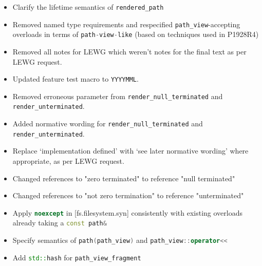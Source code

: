 \documentclass[11pt]{article}
\newcommand{\code}[2][cpp]{\lstinline[language=#1,basicstyle=\small\ttfamily]{#2}}
\begin{document}
\begin{itemize}
\begin{itemize}
    \item Clarify the lifetime semantics of \code{rendered_path}
    \item Removed named type requirements and respecified \code{path_view}-accepting overloads in terms of \code{path-view-like} (based on techniques used in P1928R4)
    \item Removed all notes for LEWG which weren't notes for the final text as per LEWG request.
    \item Updated feature test macro to \code{YYYYMML}.
    \item Removed erroneous parameter from \code{render_null_terminated} and \code{render_unterminated}.
    \item Added normative wording for \code{render_null_terminated} and \code{render_unterminated}.
    \item Replace `implementation defined' with `see later normative wording' where appropriate,
    as per LEWG request.
    \item Changed references to "zero terminated" to reference "null terminated"
    \item Changed references to "not zero termination" to reference "unterminated"
    \item Apply \code{noexcept} in [fs.filesystem.syn] consistently with existing overloads already taking a \code{const path&}
    \item Specify semantics of \code{path(path_view)} and \code{path_view::operator<<}
    \item Add \code{std::hash} for \code{path_view_fragment}
    \end{itemize}


\end{itemize}
\end{document}
